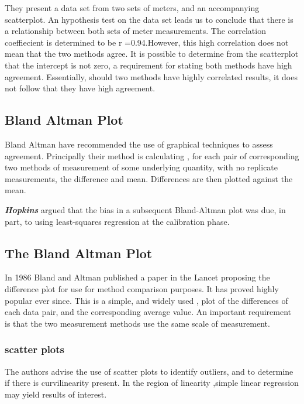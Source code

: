 \documentclass[12pt, a4paper]{report}
\theoremstyle{plain}
\theoremstyle{definition}
\theoremstyle{remark}
\begin{document}
	They present a data set from two sets of meters, and an
	accompanying scatterplot. An hypothesis test on the data set leads
	us to conclude that there is a relationship between both sets of
	meter measurements. The correlation coeffiecient is determined to
	be r =0.94.However, this high correlation does not mean that the
	two methods agree. It is possible to determine from the
	scatterplot that the intercept is not zero, a requirement for
	stating both methods have high agreement. Essentially, should two
	methods have highly correlated results, it does not follow that
	they have high agreement.
	
	\subsection{Bland Altman Plot}
	Bland Altman have recommended the use of graphical techniques to
	assess agreement. Principally their method is calculating , for
	each pair of corresponding two methods of measurement of some
	underlying quantity, with no replicate measurements, the
	difference and mean. Differences are then plotted against the
	mean.
	
	\textbf{\textit{Hopkins}} argued that the bias in a subsequent Bland-Altman plot was
	due, in part, to using least-squares regression at the calibration
	phase.
	
	
	\subsection{The Bland Altman Plot}
	In 1986 Bland and Altman published a paper in the Lancet proposing
	the difference plot for use for method comparison purposes. It has
	proved highly popular ever since. This is a simple, and widely
	used , plot of the differences of each data pair, and the
	corresponding average value. An important requirement is that the
	two measurement methods use the same scale of measurement.
	
	\subsubsection{scatter plots} The authors advise the
	use of scatter plots to identify outliers, and to determine if
	there is curvilinearity present. In the region of linearity
	,simple linear regression may yield results of interest.
	
\end{document}
